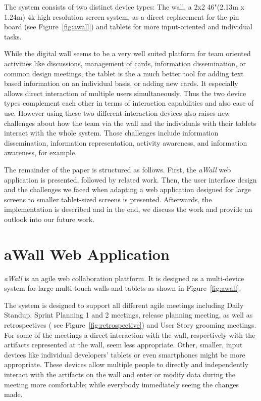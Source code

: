 \documentclass{sigchi}
\begin{document}
The system consists of two distinct device types: The wall, a 2x2 46"(2.13m x 1.24m) 4k high resolution screen system, as a direct replacement for the pin board (see Figure~\ref{fig:awall}) and tablets for more input-oriented and individual tasks.


While the digital wall seems to be a very well suited platform for team oriented activities like discussions, management of cards, information dissemination, or common design meetings, the tablet is the a much better tool for adding text based information on an individual basis, or adding new cards. It especially allows direct interaction of multiple users simultaneously. 
Thus the two device types complement each other in terms of interaction capabilities and also ease of use. 
However using these two different interaction devices also raises new challenges about how the team via the wall and the individuals with their tablets interact with the whole system. Those challenges include information dissemination, information representation, activity awareness, and information awareness, for example.

The remainder of the paper is structured as follows.
First, the \textit{aWall} web application is presented, followed by related work. Then, the user interface design and the challenges we faced when adapting a web application designed for large screens to smaller tablet-sized screens is presented.
Afterwards, the implementation is described and in the end, we discuss the work and provide an outlook into our future work.


\section{aWall Web Application}

\textit{aWall} is an agile web collaboration plattform. It is designed as a multi-device system for  large multi-touch walls and tablets as shown in Figure~\ref{fig:awall}.

The system is designed to support all different agile meetings including Daily Standup, Sprint Planning 1 and 2 meetings, release planning meeting, as well as retrospectives ( see Figure~\ref{fig:retrospective}) and User Story grooming meetings. 
For some of the meetings a direct interaction with the wall, respectively with the artifacts represented at the wall, seem less appropriate. Other, smaller, input devices like individual developers' tablets or even smartphones might be more appropriate. These devices allow multiple people to directly and independently interact with the artifacts on the wall and enter or modify data during the meeting more comfortable; while everybody immediately seeing the changes made. 
\end{document}
